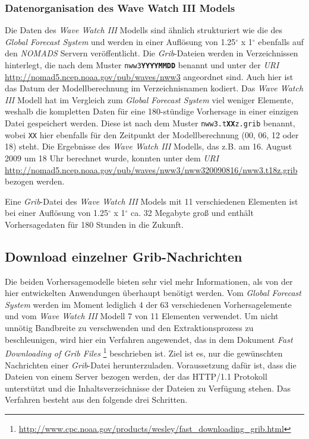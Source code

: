 \subsubsection{Datenorganisation des Wave Watch III Models}
Die Daten des \textit{Wave Watch III} Modells sind ähnlich
strukturiert wie die des \textit{Global Forecast System} und werden in
einer Auflösung von 1.25$^{\circ}$ x 1$^{\circ}$ ebenfalls auf den
\textit{NOMADS} Servern veröffentlicht. Die \textit{Grib}-Dateien
werden in Verzeichnissen hinterlegt, die nach dem Muster
\texttt{nww3\textbf{YYYYMMDD}} benannt und unter der \textit{URI}
\url{http://nomad5.ncep.noaa.gov/pub/waves/nww3} angeordnet sind. Auch
hier ist das Datum der Modellberechnung im Verzeichnisnamen
kodiert. Das \textit{Wave Watch III} Modell hat im Vergleich zum
\textit{Global Forecast System} viel weniger Elemente, weshalb die
kompletten Daten für eine 180-stündige Vorhersage in einer einzigen
Datei gespeichert werden. Diese ist nach dem Muster
\texttt{nww3.t\textbf{XX}z.grib} benannt, wobei \texttt{XX} hier
ebenfalls für den Zeitpunkt der Modellberechnung (00, 06, 12 oder 18)
steht. Die Ergebnisse des \textit{Wave Watch III} Modells, das z.B. am
16. August 2009 um 18 Uhr berechnet wurde, konnten unter dem
\textit{URI}
\url{http://nomad5.ncep.noaa.gov/pub/waves/nww3/nww320090816/nww3.t18z.grib}
bezogen werden.

Eine \textit{Grib}-Datei des \textit{Wave Watch III} Models mit 11
verschiedenen Elementen ist bei einer Auflösung von
1.25$^{\circ}$ x 1$^{\circ}$ ca. 32 Megabyte groß und enthält
Vorhersagedaten für 180 Stunden in die Zukunft.

\subsection{Download einzelner Grib-Nachrichten}
\label{subsec:download}
Die beiden Vorhersagemodelle bieten sehr viel mehr Informationen, als
von der hier entwickelten Anwendungen überhaupt benötigt werden. Vom
\textit{Global Forecast System} werden im Moment lediglich 4 der 63
verschiedenen Vorhersagelemente und vom \textit{Wave Watch III} Modell
7 von 11 Elementen verwendet. Um nicht unnötig Bandbreite zu
verschwenden und den Extraktionsprozess zu beschleunigen, wird hier
ein Verfahren angewendet, das in dem Dokument \textit{Fast Downloading
  of Grib Files}
\footnote{\url{http://www.cpc.noaa.gov/products/wesley/fast_downloading_grib.html}}
beschrieben ist. Ziel ist es, nur die gewünschten Nachrichten einer
\textit{Grib}-Datei herunterzuladen. Voraussetzung dafür ist, dass die
Dateien von einem Server bezogen werden, der das HTTP/1.1 Protokoll
unterstützt und die Inhaltsverzeichnisse der Dateien zu Verfügung
stehen. Das Verfahren besteht aus den folgende drei Schritten.

